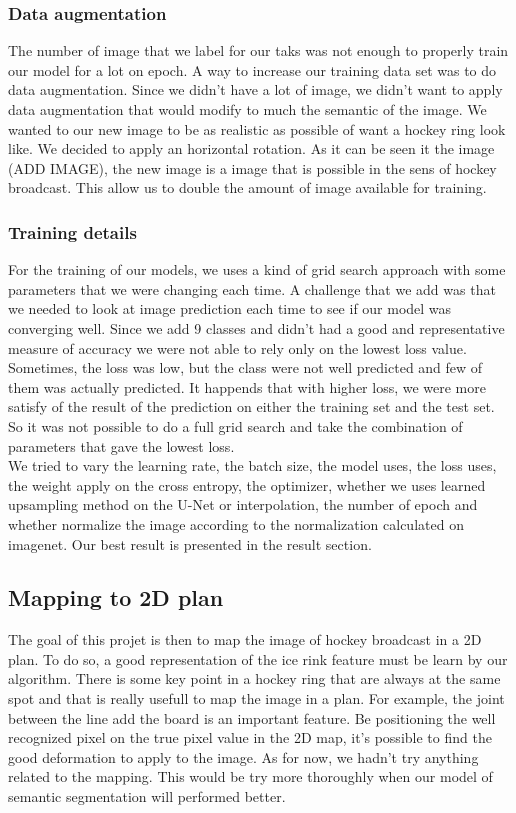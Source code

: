 \subsubsection{Data augmentation}
The number of image that we label for our taks was not enough to properly train our model for a lot on epoch. A way to increase our training data set was to do data augmentation. Since we didn't have a lot of image, we didn't want to apply data augmentation that would modify to much the semantic of the image. We wanted to 
our new image to be as realistic as possible of want a hockey ring look like. We decided to apply an horizontal rotation. As it can be seen it the image (ADD IMAGE), the new image is a image that is possible in the sens of hockey broadcast. This allow us to double the amount of image available for training. 

\subsubsection{Training details}
For the training of our models, we uses a kind of grid search approach with some parameters that we were changing each time. A challenge that we add was that we needed to look at image prediction each time to see if our model was converging well. Since we add 9 classes and didn't had a good and representative measure of accuracy we were not able to rely only on the lowest loss value. Sometimes, the loss was low, but the class were not well predicted and few of them was actually predicted. It happends that with higher loss, we were more satisfy of the result of the prediction on either the training set and the test set. So it was not possible to do a full grid search and take the combination of parameters that gave the lowest loss. 
\\
We tried to vary the learning rate, the batch size, the model uses, the loss uses, the weight apply on the cross entropy, the optimizer, whether we uses learned upsampling method on the U-Net or interpolation, the number of epoch and whether normalize the image according to the normalization calculated on imagenet. Our best result is presented in the result section. 

\subsection{Mapping to 2D plan}
The goal of this projet is then to map the image of hockey broadcast in a 2D plan. To do so, a good representation of the ice rink feature must be learn by our algorithm. There is some key point in a hockey ring that are always at the same spot and that is really usefull to map the image in a plan. For example, the joint between the line add the board is an important feature. Be positioning the well recognized pixel on the true pixel value in the 2D map, it's possible to find the good deformation to apply to the image. As for now, we hadn't try anything related to the mapping. This would be try more thoroughly when our model of semantic segmentation will performed better. 
